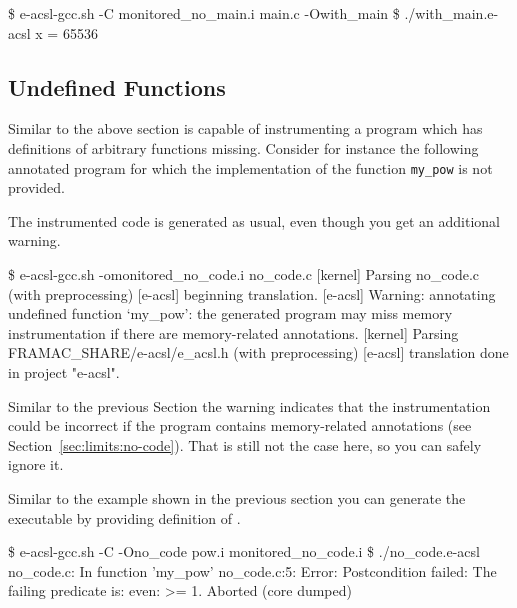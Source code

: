 
\begin{shell}
\$ e-acsl-gcc.sh -C monitored_no_main.i main.c -Owith_main
\$ ./with_main.e-acsl
x = 65536
\end{shell}


\subsection{Undefined Functions}
\label{sec:no-code}

Similar to the above section \eacsl is capable of instrumenting a program which
has definitions of arbitrary functions missing.  Consider for instance the
following annotated program for which the implementation of the function
\texttt{my\_pow} is not provided.


The instrumented code is generated as usual, even though you get an additional
warning.
\begin{shell}
\$ e-acsl-gcc.sh -omonitored_no_code.i no_code.c
[kernel] Parsing no_code.c (with preprocessing)
[e-acsl] beginning translation.
[e-acsl] Warning: annotating undefined function `my_pow':
  the generated program may miss memory instrumentation
  if there are memory-related annotations.
[kernel] Parsing FRAMAC_SHARE/e-acsl/e_acsl.h (with preprocessing)
[e-acsl] translation done in project "e-acsl".
\end{shell}

Similar to the previous Section the warning indicates that the instrumentation
could be incorrect if the program contains memory-related annotations (see
Section~\ref{sec:limits:no-code}). That is still not the case here, so you can
safely ignore it.


Similar to the example shown in the previous section you can generate the
executable by providing definition of .

\begin{shell}
\$ e-acsl-gcc.sh -C -Ono_code pow.i monitored_no_code.i
\$ ./no_code.e-acsl
no_code.c: In function 'my_pow'
no_code.c:5: Error: Postcondition failed:
        The failing predicate is:
        even: \result >= 1.
Aborted (core dumped)
\end{shell}

